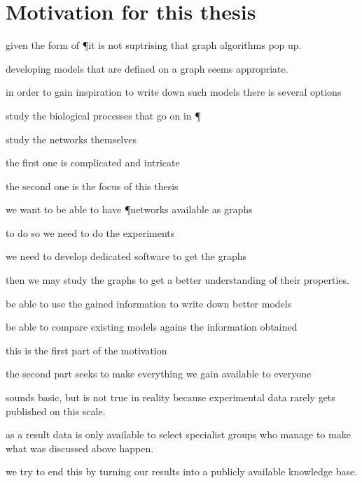\section{Motivation for this thesis}

given the form of \P it is not suptrising that graph algorithms pop up.

developing models that are defined on a graph seems appropriate.

in order to gain inspiration to write down such models there is several options

study the biological processes that go on in \P

study the networks themselves

the first one is complicated and intricate

the second one is the focus of this thesis

we want to be able to have \P networks available as graphs

to do so we need to do the experiments

we need to develop dedicated software to get the graphs

then we may study the graphs to get a better understanding of their properties.

be able to use the gained information to write down better models

be able to compare existing models agains the information obtained

this is the first part of the motivation

the second part seeks to make everything we gain available to everyone

sounds basic, but is not true in reality because experimental data rarely gets published on this scale.

as a result data is only available to select specialist groups who manage to make what was discussed above happen.

we try to end this by turning our results into a publicly available knowledge base.


